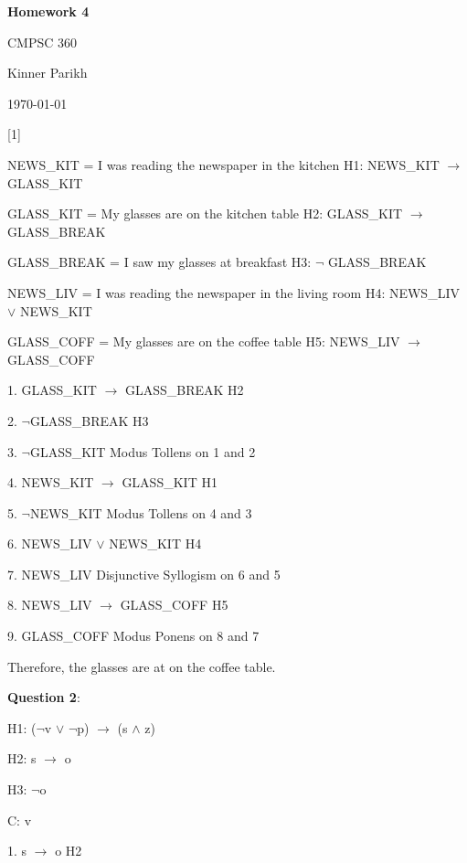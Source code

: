 \documentclass{article} %
\newcommand{\question}[2][]{\begin{flushleft}
        \textbf{Question #1}: \textit{#2}

\end{flushleft}}
\newcommand{\maketitletwo}[2][]{\begin{center}
        \Large{\textbf{Homework #1}
            
            CMPSC 360} %
        \vspace{5pt}
        
        \normalsize{Kinner Parikh  %
        
        \today}        %
        \vspace{15pt}
        
\end{center}}
\begin{document}
    \maketitletwo[4]  %
    
    \question[1]{}
    
    NEWS\_KIT = I was reading the newspaper in the kitchen \tabto*{11cm} H1: NEWS\_KIT $\rightarrow$ GLASS\_KIT
    
    GLASS\_KIT = My glasses are on the kitchen table \tabto*{11cm} H2: GLASS\_KIT $\rightarrow$ GLASS\_BREAK
    
    GLASS\_BREAK = I saw my glasses at breakfast \tabto*{11cm} H3: $\neg$ GLASS\_BREAK

    NEWS\_LIV = I was reading the newspaper in the living room \tabto*{11cm} H4: NEWS\_LIV $\lor$ NEWS\_KIT
    
    GLASS\_COFF = My glasses are on the coffee table \tabto*{11cm} H5: NEWS\_LIV $\rightarrow$ GLASS\_COFF
    
    \hspace*{0cm}

    1. GLASS\_KIT $\rightarrow$ GLASS\_BREAK \tabto*{7cm}H2

    2. $\neg$GLASS\_BREAK \tabto*{7cm}H3

    3. $\neg$GLASS\_KIT \tabto*{7cm}Modus Tollens on 1 and 2

    4. NEWS\_KIT $\rightarrow$ GLASS\_KIT \tabto*{7cm}H1

    5. $\neg$NEWS\_KIT \tabto*{7cm}Modus Tollens on 4 and 3

    6. NEWS\_LIV $\lor$ NEWS\_KIT \tabto*{7cm}H4

    7. NEWS\_LIV \tabto*{7cm}Disjunctive Syllogism on 6 and 5

    8. NEWS\_LIV $\rightarrow$ GLASS\_COFF \tabto*{7cm}H5

    9. GLASS\_COFF \tabto*{7cm}Modus Ponens on 8 and 7


    \hspace*{0cm}

    Therefore, the glasses are at on the coffee table.

    \question[2]{}

    H1: ($\neg$v $\lor$ $\neg$p) $\rightarrow$ (s $\land$ z)
    
    H2: s $\rightarrow$ o
    
    H3: $\neg$o
    
    C: v

    \hspace*{0cm}

    1. s $\rightarrow$ o \tabto*{5cm}H2
\end{document}
